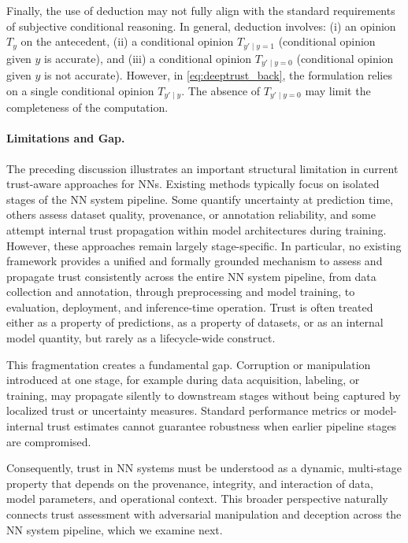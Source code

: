 Finally, the use of deduction may not fully align with the standard requirements of subjective conditional reasoning. In general, deduction involves: (i) an opinion $T_y$ on the antecedent, (ii) a conditional opinion $T_{y' \mid y=1}$ (conditional opinion given $y$ is accurate), and (iii) a conditional opinion $T_{y' \mid y=0}$ (conditional opinion given $y$ is not accurate). However, in \cref{eq:deeptrust_back}, the formulation relies on a single conditional opinion $T_{y' \mid y}$. The absence of $T_{y' \mid y=0}$ may limit the completeness of the computation.

\paragraph{Limitations and Gap.}
The preceding discussion illustrates an important structural limitation in current trust-aware approaches for \acp{NN}. Existing methods typically focus on isolated stages of the \ac{NN} system pipeline. Some quantify uncertainty at prediction time, others assess dataset quality, provenance, or annotation reliability, and some attempt internal trust propagation within model architectures during training. However, these approaches remain largely stage-specific. In particular, no existing framework provides a unified and formally grounded mechanism to assess and propagate trust consistently across the entire \ac{NN} system pipeline, from data collection and annotation, through preprocessing and model training, to evaluation, deployment, and inference-time operation. Trust is often treated either as a property of predictions, as a property of datasets, or as an internal model quantity,
but rarely as a lifecycle-wide construct.

This fragmentation creates a fundamental gap. Corruption or manipulation introduced at one stage, for example during data acquisition, labeling, or training, may propagate silently to downstream stages without being captured by localized trust or uncertainty measures. Standard performance metrics or model-internal trust estimates cannot guarantee robustness when earlier pipeline stages are compromised.

Consequently, trust in \ac{NN} systems must be understood as a dynamic, multi-stage property that depends on the provenance, integrity, and interaction of data, model parameters, and operational context. This broader perspective naturally connects trust assessment with adversarial manipulation and deception across the \ac{NN} system pipeline, which we examine next.



